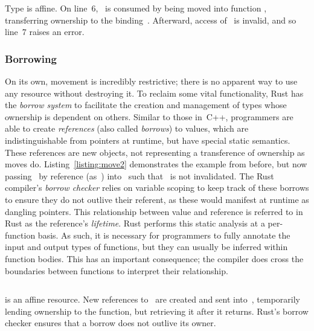 \begin{listing}[ht]
	\centering
	\inputminted[]{rust}{move.rs}
	\caption[Example of move semantics in Rust.]{Type  is affine. On line~6, ~is consumed by being moved into function , transferring ownership to the binding~. Afterward, access of~ is invalid, and so line~7 raises an error.}
	\label{listing:move}
\end{listing}

\subsubsection{Borrowing}

On its own, movement is incredibly restrictive; there is no apparent way to use any resource without destroying it. To reclaim some vital functionality, Rust has the \textit{borrow system} to facilitate the creation and management of types whose ownership is dependent on others. Similar to those in~C++, programmers are able to create \textit{references} (also called \textit{borrows}) to values, which are indistinguishable from pointers at runtime, but have special static semantics. These references are new objects, not representing a transference of ownership as moves do. Listing~\ref{listing:move2} demonstrates the example from before, but now passing~ by reference (as~) into~ such that~ is not invalidated. The Rust compiler's \textit{borrow checker} relies on variable scoping to keep track of these borrows to ensure they do not outlive their referent, as these would manifest at runtime as dangling pointers. This relationship between value and reference is referred to in Rust as the reference's \textit{lifetime}. Rust performs this static analysis at a per-function basis. As such, it is necessary for programmers to fully annotate the input and output types of functions, but they can usually be inferred within function bodies. This has an important consequence; the compiler does cross the boundaries between functions to interpret their relationship. 

\begin{listing}[ht]
	\centering
	\inputminted[]{rust}{move2.rs}
	\caption[Example of borrowing in Rust.]{ is an affine resource. New references to~ are created and sent into~, temporarily lending ownership to the function, but retrieving it after it returns. Rust's borrow checker ensures that a borrow does not outlive its owner.}
	\label{listing:move2}
\end{listing}

